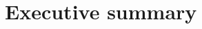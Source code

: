 \documentclass{article}
\begin{document}
%
%


%
%


%
%

\section{Executive summary}
\end{document}
